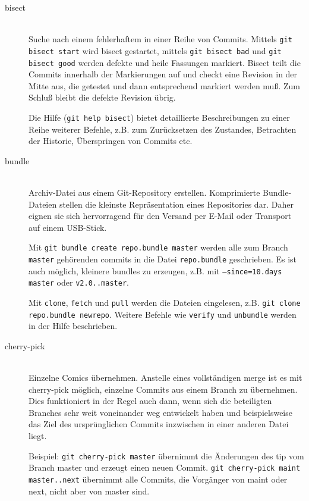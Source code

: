 \documentclass[a4paper, 12pt]{article}
\begin{document}
\begin{description}
  \item[bisect] \hfill \\
  Suche nach einem fehlerhaftem in einer Reihe von Commits. Mittels \texttt{git bisect start} wird bisect gestartet, mittels \texttt{git bisect bad} und \texttt{git bisect good} werden defekte und heile Fassungen markiert. Bisect teilt die Commits innerhalb der Markierungen auf und checkt eine Revision in der Mitte aus, die getestet und dann entsprechend markiert werden muß. Zum Schluß bleibt die defekte Revision übrig.
    
  Die Hilfe (\texttt{git help bisect}) bietet detaillierte Beschreibungen zu einer Reihe weiterer Befehle, z.B. zum Zurücksetzen des Zustandes, Betrachten der Historie, Überspringen von Commits etc.
  \item[bundle] \hfill \\
  Archiv-Datei aus einem Git-Repository erstellen. Komprimierte Bundle-Dateien stellen die kleinste Repräsentation eines Repositories dar. Daher eignen sie sich hervorragend für den Versand per E-Mail oder Transport auf einem USB-Stick. 
  
  Mit \texttt{git bundle create repo.bundle master} werden alle zum Branch \texttt{master} gehörenden commits in die Datei \texttt{repo.bundle} geschrieben. Es ist auch möglich, kleinere bundles zu erzeugen, z.B. mit \texttt{--since=10.days master} oder \texttt{v2.0..master}.
  
  Mit \texttt{clone}, \texttt{fetch} und \texttt{pull} werden die Dateien eingelesen, z.B. \texttt{git clone repo.bundle newrepo}. Weitere Befehle wie \texttt{verify} und \texttt{unbundle} werden in der Hilfe beschrieben.

  \item[cherry-pick] \hfill \\
  Einzelne Comics übernehmen. Anstelle eines vollständigen merge ist es mit cherry-pick möglich, einzelne Commits aus einem Branch zu übernehmen. Dies funktioniert in der Regel auch dann, wenn sich die beteiligten Branches sehr weit voneinander weg entwickelt haben und beispielsweise das Ziel des ursprünglichen Commits inzwischen in einer anderen Datei liegt.
  
  Beispiel: \texttt{git cherry-pick master} übernimmt die Änderungen des tip vom Branch master und erzeugt einen neuen Commit. \texttt{git cherry-pick maint master..next} übernimmt alle Commits, die Vorgänger von maint oder next, nicht aber von master sind.
  

\end{description}
\end{document}
